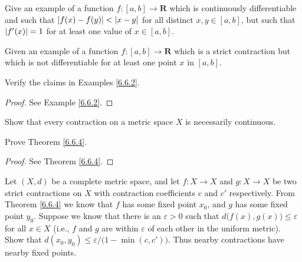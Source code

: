 \begin{exercise}\label{ex 6.6.3}
    Give an example of a function \(f : [a, b] \to \mathbf{R}\) which is continuously differentiable and such that \(\abs*{f(x) - f(y)} < \abs*{x - y}\) for all distinct \(x, y \in [a, b]\), but such that \(\abs*{f'(x)} = 1\) for at least one value of \(x \in [a, b]\).
\end{exercise}

\begin{exercise}\label{ex 6.6.4}
    Given an example of a function \(f : [a, b] \to \mathbf{R}\) which is a strict contraction but which is not differentiable for at least one point \(x\) in \([a, b]\).
\end{exercise}

\begin{exercise}\label{ex 6.6.5}
    Verify the claims in Examples \ref{6.6.2}.
\end{exercise}

\begin{proof}
    See Example \ref{6.6.2}.
\end{proof}

\begin{exercise}\label{ex 6.6.6}
    Show that every contraction on a metric space \(X\) is necessarily continuous.
\end{exercise}

\begin{exercise}\label{ex 6.6.7}
    Prove Theorem \ref{6.6.4}.
\end{exercise}

\begin{proof}
    See Theorem \ref{6.6.4}.
\end{proof}

\begin{exercise}\label{ex 6.6.8}
    Let \((X, d)\) be a complete metric space, and let \(f : X \to X\) and \(g : X \to X\) be two strict contractions on \(X\) with contraction coefficients \(c\) and \(c'\) respectively.
    From Theorem \ref{6.6.4} we know that \(f\) has some fixed point \(x_0\), and \(g\) has some fixed point \(y_0\).
    Suppose we know that there is an \(\varepsilon > 0\) such that \(d\big(f(x), g(x)\big) \leq \varepsilon\) for all \(x \in X\)
    (i.e., \(f\) and \(g\) are within \(\varepsilon\) of each other in the uniform metric).
    Show that \(d(x_0, y_0) \leq \varepsilon / \big(1 - \min(c, c')\big)\).
    Thus nearby contractions have nearby fixed points.
\end{exercise}